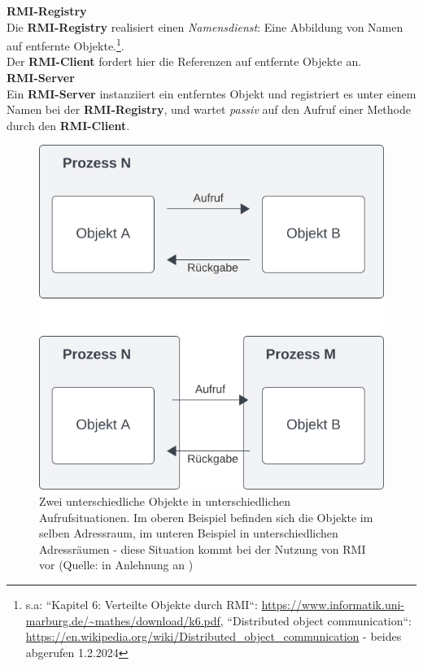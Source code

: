 \begin{tcolorbox}[enlarge top by=0.5cm,enlarge bottom by=0.5cm]
    \noindent
    \textbf{RMI-Registry}\\
    Die \textbf{RMI-Registry} realisiert einen \textit{Namensdienst}: Eine Abbildung von Namen auf entfernte Objekte.\footnote{
        s.a: ``Kapitel 6: Verteilte Objekte durch RMI``: \url{https://www.informatik.uni-marburg.de/~mathes/download/k6.pdf}, ``Distributed object communication``: \url{https://en.wikipedia.org/wiki/Distributed_object_communication} - beides abgerufen 1.2.2024
    }. \\
    Der \textbf{RMI-Client} fordert hier die Referenzen auf entfernte Objekte an.\\

    \noindent
    \textbf{RMI-Server}\\
    Ein \textbf{RMI-Server} instanziiert ein entferntes Objekt und registriert es unter einem Namen bei der \textbf{RMI-Registry}, und wartet \textit{passiv} auf den Aufruf einer Methode durch den \textbf{RMI-Client}.

\end{tcolorbox}


\begin{figure}
    \centering
    \includegraphics[scale=0.5]{chapters/fopt5/img/rmi/processcall}
    \caption{Zwei unterschiedliche Objekte in unterschiedlichen Aufrufsituationen. Im oberen Beispiel befinden sich die Objekte im selben Adressraum, im unteren Beispiel in unterschiedlichen Adressräumen - diese Situation kommt bei der Nutzung von RMI vor (Quelle: in Anlehnung an \cite[311 f., Abbildung 6.1 und 6.2]{Oec22})}
    \label{fig:processcall}
\end{figure}

